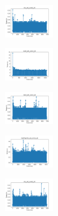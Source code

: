 \vspace*{\fill}
\newpage
\vspace*{\fill}

\begin{figure}[H]    
    \centering
    \begin{subfigure}
        \centering
        \includegraphics[width=0.234\textwidth]{img/am01mej/iris_set_const_20_949004259_time.png}
    \end{subfigure}
    \hfill
    \begin{subfigure}
        \centering
        \includegraphics[width=0.234\textwidth]{img/am01mej/ecoli_set_const_20_949004259_time.png}
    \end{subfigure}
    \hfill
    \begin{subfigure}
        \centering
        \includegraphics[width=0.234\textwidth]{img/am01mej/rand_set_const_20_949004259_time.png}
    \end{subfigure}
    \hfill
    \begin{subfigure}
        \centering
        \includegraphics[width=0.234\textwidth]{img/am01mej/newthyroid_set_const_20_949004259_time.png}
    \end{subfigure}
    \hfill
    \begin{subfigure}
        \centering
        \includegraphics[width=0.234\textwidth]{img/am01mej/iris_set_const_20_589741062_time.png}

\end{subfigure}
\end{figure}
